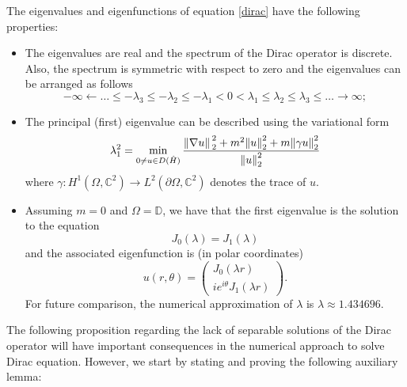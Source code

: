 \begin{proposition}
    The eigenvalues and eigenfunctions of equation \eqref{dirac} have the following properties:
    \begin{itemize}
        \item The eigenvalues are real and the spectrum of the Dirac operator is discrete. Also, the spectrum is symmetric with respect to zero and the eigenvalues can be arranged as follows
        \[
        -\infty \leftarrow \dots \leq -\lambda_3 \leq -\lambda_2 \leq -\lambda_1 < 0 < \lambda_1 \leq \lambda_2 \leq \lambda_3 \leq \dots \rightarrow \infty;
        \]
        \item The principal (first) eigenvalue can be described using the variational form
        \[
        \lambda_1^2 = \min_{0 \neq u \in D(\hat{H})}\frac{\norm*{\nabla u}_2^2 + m^2 \norm{u}_2^2 + m \norm{\gamma u}_2^2}{\norm{u}_2^2}
        \]
        where \(\gamma: H^1(\Omega, \mathbb{C}^2) \rightarrow L^2(\partial\Omega, \mathbb{C}^2)\) denotes the trace of \(u\).
        \item Assuming \(m=0\) and \(\Omega = \mathbb{D}\), we have that the first eigenvalue is the solution to the equation
        \[
        J_0(\lambda) = J_1(\lambda)
        \]
        and the associated eigenfunction is (in polar coordinates)
        \[
        u(r, \theta) = \begin{pmatrix}
            J_0(\lambda r)\\
            i e^{i \theta}J_1(\lambda r)
        \end{pmatrix}.    
        \]
        For future comparison, the numerical approximation of \(\lambda\) is \(\lambda \approx 1.434696\).
    \end{itemize}
\end{proposition}

The following proposition regarding the lack of separable solutions of the Dirac operator will have important consequences in the numerical approach to solve Dirac equation. However, we start by stating and proving the following auxiliary lemma:

